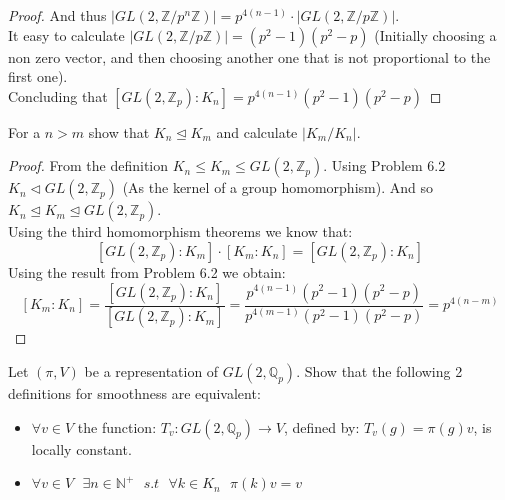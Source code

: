 \documentclass[12pt]{article}
\newenvironment{problem}[2][Problem]{\begin{trivlist}
\item[\hskip \labelsep {\bfseries #1}\hskip \labelsep {\bfseries #2.}]}{\end{trivlist}}
\theoremstyle{definition}
\theoremstyle{lemma}
\theoremstyle{conclusion}
\def\zint{\mathbb{Z}}
\def\zp{\zint_{p}}
\def\qp{\mathbb{Q}_{p}}
\def\zmodnz#1{\zint/#1\zint}
\def\zmodpz{\zmodnz p}
\def\zmodpnz{\zmodnz{p^{n}}}
\def\gl#1{GL(2, #1)}
\def\glzp{\gl{\zp}}
\def\glqp{\gl{\qp}}
\numberwithin{equation}{section}
\begin{document}
\begin{enumerate}
\begin{proof}
And thus $|\gl {\zmodpnz}| = p^{4(n-1)}\cdot |\gl {\zmodpz}|$.\\ 
It easy to calculate $|\gl {\zmodpz}| = (p^2 - 1)(p^2 - p)$ (Initially choosing a non zero vector, and then choosing another one that is not proportional to the first one). 
\\Concluding that $[\glzp:K_n] = p^{4(n-1)} (p^2 - 1)(p^2 - p)$
\end{proof}
\end{enumerate}

\begin{problem}{6.3}
For a $n > m$ show that $K_n \unlhd K_m$ and calculate $|K_m/K_n|$.
\end{problem}

\begin{proof}
From the definition $K_n \leqslant K_m \leqslant \glzp$. Using Problem 6.2 $K_n \lhd \glzp $ (As the kernel of a group homomorphism). And so $K_n \unlhd K_m \unlhd \glzp$. 
\\ Using the third homomorphism theorems we know that: 
$$[\glzp : K_m]\cdot[K_m:K_n] = [\glzp:K_n]$$
Using the result from Problem 6.2 we obtain:
$$[K_m:K_n] = \frac{[\glzp:K_n]}{[\glzp : K_m]} = \frac{p^{4(n-1)} (p^2 - 1)(p^2 - p)}{p^{4(m-1)} (p^2 - 1)(p^2 - p)} = p^{4(n-m)}$$
\end{proof}

\begin{problem}{6.5}
Let $(\pi, V)$ be a representation of $\glqp$. Show that the following 2 definitions for smoothness are equivalent:
\begin{itemize}
\item[a.] $\forall v \in V$ the function:
 $T_v: \gl \qp \rightarrow V$, defined by: $T_v(g) = \pi(g)v$, is locally constant.
\item[b.] $\forall v \in V \textbf{ } \exists n \in \mathbb{N}^+ \textbf{ }s.t \textbf{ }\forall k \in K_n \textbf{ }\pi(k)v=v$
\end{itemize} 

\end{problem}
\end{document}
